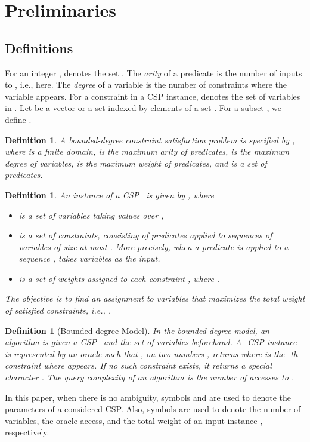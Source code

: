 \documentclass[letterpaper, 11pt]{article}
\newtheorem{definition}[theorem]{Definition}
\begin{document}
\section{Preliminaries}\label{sec:pre}
\subsection{Definitions}
For an integer ,  denotes the set .
The \textit{arity} of a predicate  is the number of inputs to , i.e.,  here.
The \textit{degree} of a variable is the number of constraints where the variable appears.
For a constraint  in a CSP instance,
 denotes the set of variables in .
Let  be a vector or a set indexed by elements of a set .
For a subset ,
we define .

\begin{definition}
A \textit{bounded-degree constraint satisfaction problem}  is specified by ,
where  is a finite domain,
 is the maximum arity of predicates,
 is the maximum degree of variables, 
 is the maximum weight of predicates,
and  is a set of predicates.
\end{definition}
\begin{definition}
An instance  of a CSP~ is given by ,
where 
\begin{itemize}
\setlength{\itemsep}{0pt}
\item  is a set of variables taking values over ,
\item  is a set of constraints,
  consisting of predicates  applied to sequences  of variables  of size at most .
  More precisely, 
  when a predicate  is applied to a sequence ,
   takes variables  as the input. 
\item  is a set of weights  assigned to each constraint , 
  where .
\end{itemize}
The objective is to find an assignment to variables  that maximizes the total weight of satisfied constraints,
i.e., .
\end{definition}
\begin{definition}[Bounded-degree Model]
  In \textit{the bounded-degree model},
  an algorithm is given a CSP~ and the set of variables  beforehand.
  A -CSP instance  is represented by an oracle  such that , on two numbers ,
  returns  where  is the -th constraint where  appears.
  If no such constraint exists, it returns a special character .
  The \textit{query complexity} of an algorithm is the number of accesses to .
\end{definition}


In this paper, when there is no ambiguity,
symbols  and  are used to denote the parameters of a considered CSP.
Also, symbols  are used to denote the number of variables, the oracle access, and the total weight of an input instance , respectively.
\end{document}
